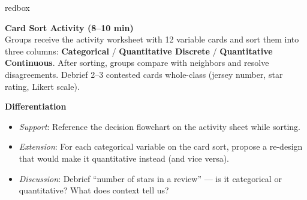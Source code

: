 \documentclass[10pt]{article}
\begin{document}
\begin{skillbox}{redbox}
\begin{minipage}[t]{0.48\linewidth}
    \textbf{Card Sort Activity (8--10 min)}\\
    Groups receive the activity worksheet with 12 variable cards and sort
    them into three columns: \textbf{Categorical} /
    \textbf{Quantitative Discrete} / \textbf{Quantitative Continuous}.
    After sorting, groups compare with neighbors and resolve disagreements.
    Debrief 2--3 contested cards whole-class (jersey number, star rating,
    Likert scale).
\end{minipage}
\hfill
\begin{minipage}[t]{0.48\linewidth}
    \textbf{Differentiation}
    \begin{itemize}
        \item \textit{Support}: Reference the decision flowchart on the
              activity sheet while sorting.
        \item \textit{Extension}: For each categorical variable on the card sort,
              propose a re-design that would make it quantitative instead
              (and vice versa).
        \item \textit{Discussion}: Debrief ``number of stars in a review'' ---
              is it categorical or quantitative? What does context tell us?
    \end{itemize}
\end{minipage}
\end{skillbox}
\end{document}
